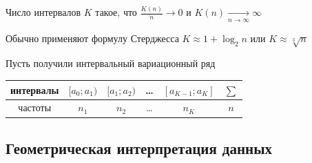 \documentclass[12pt]{article}
\begin{document}
\begin{enumerate}
    Число интервалов $K$ такое, что $\frac{K(n)}{n} \longrightarrow 0$ и $K(n) \underset{n \to \infty}{\longrightarrow} \infty$

    Обычно применяют формулу Стерджесса $K \approx 1 + \log_2 n$ или $K \approx \sqrt[3]{n}$

    Пусть получили интервальный вариационный ряд

    \begin{tabular}{c|c|c|c|c|c}
        интервалы & $[a_0; a_1)$ & $[a_1; a_2)$ & \dots & $[a_{K - 1}; a_K]$ & $\sum$ \\ 
        \hline
        частоты & $n_1$ & $n_2$ & \dots & $n_K$ & $n$ \\ 
    \end{tabular}

\end{enumerate}

\subsection{Геометрическая интерпретация данных}

\end{document}
